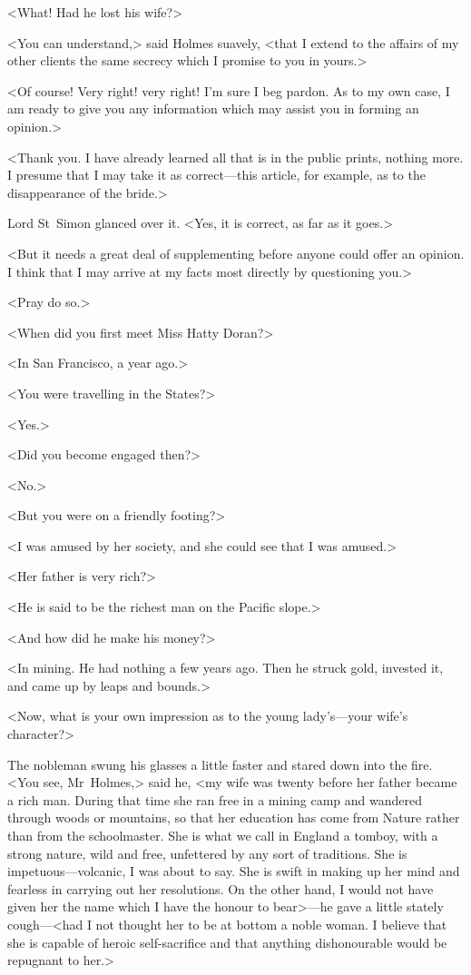 <What! Had he lost his wife?>

<You can understand,> said Holmes suavely, <that I extend to the affairs of my other clients the same secrecy which I promise to you in yours.>

<Of course! Very right! very right! I'm sure I beg pardon. As to my own case, I am ready to give you any information which may assist you in forming an opinion.>

<Thank you. I have already learned all that is in the public prints, nothing more. I presume that I may take it as correct—this article, for example, as to the disappearance of the bride.>

Lord St~Simon glanced over it. <Yes, it is correct, as far as it goes.>

<But it needs a great deal of supplementing before anyone could offer an opinion. I think that I may arrive at my facts most directly by questioning you.>

<Pray do so.>

<When did you first meet Miss Hatty Doran?>

<In San Francisco, a year ago.>

<You were travelling in the States?>

<Yes.>

<Did you become engaged then?>

<No.>

<But you were on a friendly footing?>

<I was amused by her society, and she could see that I was amused.>

<Her father is very rich?>

<He is said to be the richest man on the Pacific slope.>

<And how did he make his money?>

<In mining. He had nothing a few years ago. Then he struck gold, invested it, and came up by leaps and bounds.>

<Now, what is your own impression as to the young lady's—your wife's character?>

The nobleman swung his glasses a little faster and stared down into the fire. <You see, Mr~Holmes,> said he, <my wife was twenty before her father became a rich man. During that time she ran free in a mining camp and wandered through woods or mountains, so that her education has come from Nature rather than from the schoolmaster. She is what we call in England a tomboy, with a strong nature, wild and free, unfettered by any sort of traditions. She is impetuous—volcanic, I was about to say. She is swift in making up her mind and fearless in carrying out her resolutions. On the other hand, I would not have given her the name which I have the honour to bear>—he gave a little stately cough—<had I not thought her to be at bottom a noble woman. I believe that she is capable of heroic self-sacrifice and that anything dishonourable would be repugnant to her.>

